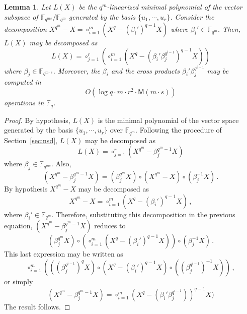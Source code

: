 \documentclass{sig-alternate}
\newcommand{\ff}[1]{\mathbb{F}_{#1}}
\newcommand{\qq}{q}
\newcommand{\nn}{n}
\newcommand{\qn}{{\qq^\nn}}
\newcommand{\basef}{\ff{\qq}}
\newcommand{\extf}{\ff{\qn}}
\newcommand{\bigO}{O}
\newcommand{\Mul}{\mathsf{M}}
\newtheorem{Lem}{Lemma}
\begin{document}
\begin{Lem}
\label{linearized_decomposition}
Let $L(X)$ be the $\qq^m$-linearized minimal polynomial of the vector subspace  of $\mathbb{F}_{\qq^{ms}}/\mathbb{F}_{\qq^m}$ generated by the basis $\{u_1, \cdots, u_r\}$. Consider the decomposition
$X^{\qq^{m}}-X=\circ_{i=1}^{m} (X^{\qq}-(\beta_i')^{\qq-1} X)$ where $\beta_i' \in \mathbb{F}_{\qq^{m}}$. Then, $L(X)$ may be decomposed as
\begin{equation}
\label{decomp_total}
L(X)=\circ_{j=1}^{r} \left( \circ_{i=1}^{m} (X^\qq-(\beta_i'  \beta_j^{\qq^{i-1}})^{q-1}   X) \right)
\end{equation}
where $\beta_j \in \mathbb{F}_{\qq^{m\cdot s}}$. Moreover, the $\beta_i$ and the cross products $\beta_i' \beta_j^{q^{i-1}}$ may be computed in 
$$\bigO(\log q \cdot m \cdot r^2 \cdot \Mul(m \cdot s))$$
operations in $\basef$.
\end{Lem}
\begin{proof}
By hypothesis, $L(X)$ is the minimal polynomial of the vector space generated by the basis $\{u_1, \cdots, u_r\}$ over $\mathbb{F}_{\qq^m}$. Following the procedure of Section~\ref{sec:nsd}, $L(X)$ may be decomposed as
$$L(X)=\circ_{j=1}^r (X^{\qq^m} -\beta_j^{\qq^m-1}X) $$
where $\beta_j \in \mathbb{F}_{\qq^{ms}}$.
Also,  
\begin{equation}
\label{basic_decomp}
(X^{\qq^{m}}-\beta_j^{\qq^{m}-1} X)= (\beta_j^{\qq^{m}} X) \circ (X^{\qq^{m}}-X)\circ(\beta_j^{-1}X)\,.
\end{equation}
By hypothesis $X^{\qq^{m}}-X$ may be decomposed as
\begin{equation}
\label{decomp_basef}
X^{\qq^{m}}-X=\circ_{i=1}^{m} (X^{\qq}-(\beta_i')^{\qq-1} X)\,,
\end{equation}
where $\beta_i' \in \mathbb{F}_{\qq^{m}}$. Therefore, substituting this decomposition in the previous equation, $(X^{\qq^{m}}-\beta_j^{\qq^{m}-1} X)$ reduces to 
$$(\beta_j^{\qq^{m}} X) \circ    \left(    \circ_{i=1}^{m} (X^{\qq}  -(\beta_i')^{\qq-1}    X)  \right) \circ(\beta_j^{-1}X)\,.$$
This last expression may be written as
$$\circ_{i=1}^{m} \left( ((\beta_j^{\qq^{i-1}})^\qq X) \circ  (X^{\qq}- (\beta_i')^{\qq-1}    X) \circ   ((\beta_j^{\qq^{i-1}})^{-1}X)  \right)\,,$$ 
or simply
\begin{equation}
\label{decomp_partial}
(X^{\qq^{m}}- \beta_j^{\qq^{m}-1} X)=\circ_{i=1}^{m} (X^\qq-(\beta_i' \beta_j^{\qq^{i-1}}) )^{q-1} X)
\end{equation}
The result follows.
\end{proof}
\end{document}
